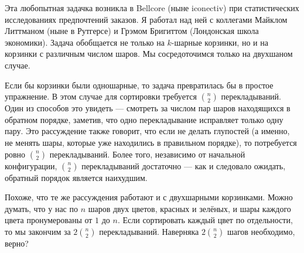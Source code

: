 Эта любопытная задачка возникла в Bellcore (ныне iconectiv) при статистических исследованиях предпочтений заказов.
Я работал над ней с коллегами Майклом Литтманом (ныне в Рутгерсе) и Грэмом Бригиттом (Лондонская школа экономики).
Задача обобщается не только на $k$-шарные корзинки, но и на корзинки с различным числом шаров.
Мы сосредоточимся только на двухшаном случае.

\medskip

Если бы корзинки были одношарные, то задача превратилась бы в простое упражнение.
В этом случае  для сортировки требуется $\binom{n}{2}$ перекладываний.
Один из способов это увидеть --- смотреть за числом пар шаров находящихся в обратном порядке, заметив, что одно перекладывание исправляет только одну пару.
Это рассуждение также говорит, что если не делать глупостей (а именно, не менять шары, которые уже находились в правильном порядке), то потребуется ровно $\binom{n}{2}$ перекладываний.
Более того, независимо от начальной конфигурации, $\binom{n}{2}$ перекладываний достаточно --- как и следовало ожидать, обратный порядок является наихудшим.

\medskip

Похоже, что те же рассуждения работают и с двухшарными корзинками.
Можно думать, что у нас по $n$ шаров двух цветов, красных и зелёных, и шары каждого цвета пронумерованы от $1$ до $n$.
Если сортировать каждый цвет по отдельности, то мы закончим за $2\binom{n}{2}$ перекладываний.
Наверняка $2\binom{n}{2}$ шагов необходимо, верно?

